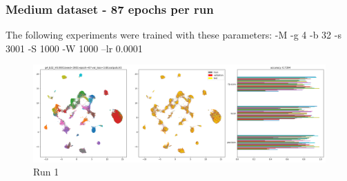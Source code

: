\documentclass{article}
\begin{document}
\clearpage

\subsubsection*{Medium dataset - 87 epochs per run}
The following experiments were trained with these parameters: 
\newline
-M -g 4 -b 32 -s 3001 -S 1000 -W 1000 --lr 0.0001

\begin{figure}[h!]
  \includegraphics[width=\linewidth]{new_journal/figures/experiments/roznet_attn/medium/lr0.0001/run1.png}
  \caption{Run 1}
\end{figure}
\end{document}
